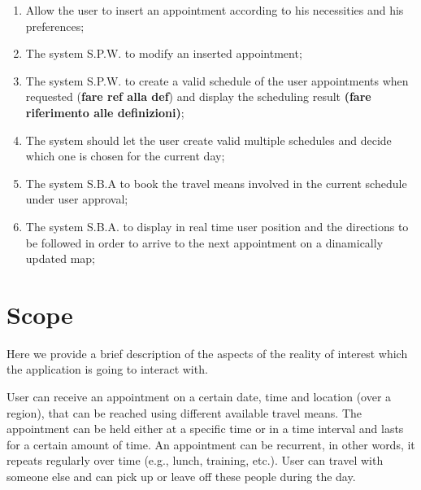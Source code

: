 \begin{enumerate}
\item Allow the user to insert an appointment according to his necessities and his preferences;
\label{goal:G1}

\item The system S.P.W. to modify an inserted appointment;
\label{goal:G2} 

\item The system S.P.W. to create a valid schedule of the user appointments when requested (\textbf{fare ref alla def}) and display the scheduling result \textbf{(fare riferimento alle definizioni)};
\label{goal:G3}

\item The system should let the user create valid multiple schedules and decide which one is chosen for the current day;
\label{goal:G4}

\item The system S.B.A to book the travel means involved in the current schedule under user approval;
\label{goal:G7} 

\item The system S.B.A. to display in real time user position and the directions to be followed in order to arrive to the next appointment on a dinamically updated map; \label{G8}

\end{enumerate}


\section{Scope}

Here we provide a brief description of the aspects of the reality of interest which the application is going to interact with.

User can receive an appointment on a certain date, time and location (over a region), that can be reached using different available travel means. The appointment can be held either at a specific time or in a time interval and lasts for a certain amount of time. An appointment can be recurrent, in other words, it repeats regularly over time (e.g., lunch, training, etc.). User can travel with someone else and can pick up or leave off these people during the day.

